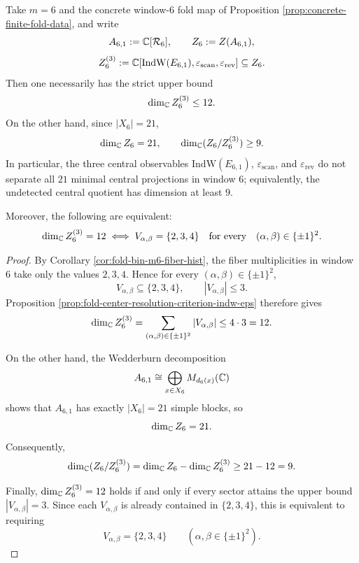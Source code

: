 \begin{theorem}\label{thm:fold-window6-center-three-observables-dimension-defect}
Take \(m=6\) and the concrete window-\(6\) fold map of Proposition \ref{prop:concrete-finite-fold-data}, and write
\[
A_{6,1}:=\mathbb{C}[\mathcal R_6],
\qquad
Z_6:=Z(A_{6,1}),
\]
\[
Z_6^{(3)}
:=
\mathbb{C}\!\left[
\mathrm{IndW}(E_{6,1}),
\varepsilon_{\mathrm{scan}},
\varepsilon_{\mathrm{rev}}
\right]
\subseteq Z_6.
\]
Then one necessarily has the strict upper bound
\[
\dim_{\mathbb{C}}Z_6^{(3)}\le 12.
\]
On the other hand, since \(|X_6|=21\),
\[
\dim_{\mathbb{C}}Z_6=21,
\qquad
\dim_{\mathbb{C}}(Z_6/Z_6^{(3)})\ge 9.
\]
In particular, the three central observables \(\mathrm{IndW}(E_{6,1})\), \(\varepsilon_{\mathrm{scan}}\), and \(\varepsilon_{\mathrm{rev}}\) do not separate all \(21\) minimal central projections in window \(6\); equivalently, the undetected central quotient has dimension at least \(9\).

Moreover, the following are equivalent:
\[
\dim_{\mathbb{C}}Z_6^{(3)}=12
\iff
V_{\alpha,\beta}=\{2,3,4\}
\quad\text{for every}\quad
(\alpha,\beta)\in\{\pm1\}^2.
\]
\end{theorem}
\begin{proof}
By Corollary \ref{cor:fold-bin-m6-fiber-hist}, the fiber multiplicities in window \(6\) take only the values \(2,3,4\). Hence for every \((\alpha,\beta)\in\{\pm1\}^2\),
\[
V_{\alpha,\beta}\subseteq \{2,3,4\},
\qquad
|V_{\alpha,\beta}|\le 3.
\]
Proposition \ref{prop:fold-center-resolution-criterion-indw-eps} therefore gives
\[
\dim_{\mathbb{C}}Z_6^{(3)}
=
\sum_{(\alpha,\beta)\in\{\pm1\}^2}|V_{\alpha,\beta}|
\le
4\cdot 3=12.
\]

On the other hand, the Wedderburn decomposition
\[
A_{6,1}\cong \bigoplus_{x\in X_6}M_{d_6(x)}(\mathbb{C})
\]
shows that \(A_{6,1}\) has exactly \(|X_6|=21\) simple blocks, so
\[
\dim_{\mathbb{C}}Z_6=21.
\]
Consequently,
\[
\dim_{\mathbb{C}}(Z_6/Z_6^{(3)})
=
\dim_{\mathbb{C}}Z_6-\dim_{\mathbb{C}}Z_6^{(3)}
\ge
21-12=9.
\]

Finally, \(\dim_{\mathbb{C}}Z_6^{(3)}=12\) holds if and only if every sector attains the upper bound \(|V_{\alpha,\beta}|=3\). Since each \(V_{\alpha,\beta}\) is already contained in \(\{2,3,4\}\), this is equivalent to requiring
\[
V_{\alpha,\beta}=\{2,3,4\}
\qquad
(\alpha,\beta\in\{\pm1\}^2).
\]
\end{proof}

\endinput
